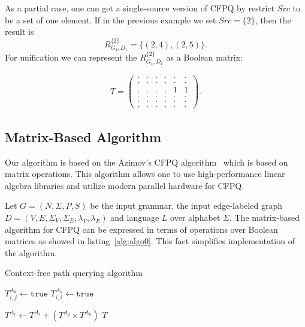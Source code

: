 As a partial case, one can get a single-source version of CFPQ by restrict $Src$ to be a set of one element. 
If in the previous example we set $Src=\{2\}$, then the result is $$R_{G_1, D_1}^{\{2\}} = \{(2, 4), (2, 5)\}.$$ 
For unification we can represent the $R_{G_1, D_1}^{\{2\}}$ as a Boolean matrix:

\begin{align*}
T =
\begin{pmatrix}
    . & . & . & . & . & . \\
    . & . & . & . & . & . \\
    . & . & . & . & 1 & 1 \\
    . & . & . & . & . & . \\ 
    . & . & . & . & . & . \\ 
    . & . & . & . & . & .
\end{pmatrix}.
\end{align*}
 
\subsection{Matrix-Based Algorithm}
Our algorithm is based on the Azimov's CFPQ algorithm~\cite{Azimov:2018:CPQ:3210259.3210264} which is based on matrix operations.
This algorithm allows one to use high-performance linear algebra libraries and utilize modern parallel hardware for CFPQ.

Let $G = (N, \Sigma, P, S)$ be the input grammar, the input edge-labeled graph $D = (V, E, \Sigma_V, \Sigma_E, \lambda_V, \lambda_E)$ and language $L$ over alphabet $\Sigma$.
The matrix-based algorithm for CFPQ can be expressed in terms of operations over Boolean matrices as showed in listing~\ref{alg:algo0}. 
This fact simplifies implementation of the algorithm.

{\footnotesize
\begin{algorithm}
\begin{algorithmic}[1]
\caption{Context-free path querying algorithm}
\label{alg:algo0}
          {$T^{A_k}_{i,j} \gets \texttt{true}$}
    \EndFor
            {$T^{A_k}_{i,i} \gets \texttt{true}$}
        \EndFor
    \EndFor

          { $T^{A_i} \gets T^{A_i} + (T^{A_j} \times T^{A_k})$ } 
        \EndFor
    \EndWhile
\State \Return $T$
\EndFunction
\end{algorithmic}
\end{algorithm}
}

